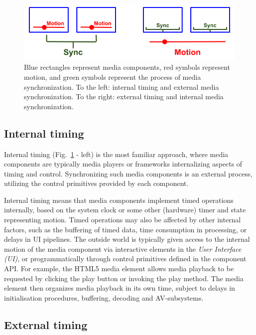 \documentclass[graybox]{svmult}
\begin{document}
\begin{figure}[h]
\centering
\includegraphics[scale=.4]{fig/internal-external.png}
\caption{
  Blue rectangles represent media components, red symbols represent motion, and green symbols represent the process of media synchronization. To the left: internal timing and external media synchronization. To the right: external timing and internal media synchronization.
}
\label{fig:internalexternal}
\end{figure}


\subsection{Internal timing}

Internal timing (Fig.~\ref{fig:internalexternal} - left) is the most
familiar approach, where media components are typically media players or frameworks
internalizing aspects of timing and control. Synchronizing such media
components is an external process, utilizing the control primitives provided
by each component.

Internal timing means that media components implement timed operations
internally, based on the system clock or some other (hardware) timer and state
representing motion. Timed operations may also be affected by other internal
factors, such as the buffering of timed data, time consumption in processing,
or delays in UI pipelines. The outside world is typically given access to the
internal motion of the media component via interactive elements in the \emph{User Interface (UI)}, or
programmatically through control primitives defined in the component API. For
example, the HTML5 media element allows media playback to be requested by
clicking the play button or invoking the play method. The media element then
organizes media playback in its own time, subject to delays in initialisation
procedures, buffering, decoding and AV-subsystems.

\subsection {External timing}
\end{document}
